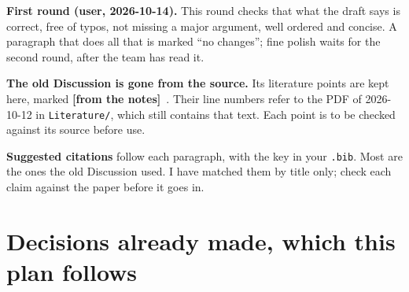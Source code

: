 \documentclass[11pt]{article}
\newcommand{\Note}{\textcolor{open}{\textbf{[from the notes]}}\ }
\begin{document}
\textbf{First round (user, 2026-10-14).} This round checks that what the
draft says is correct, free of typos, not missing a major argument, well
ordered and concise. A paragraph that does all that is marked ``no changes'';
fine polish waits for the second round, after the team has read it.

\textbf{The old Discussion is gone from the source.} Its literature points
are kept here, marked \Note. Their line numbers refer to the PDF of
2026-10-12 in \texttt{Literature/}, which still contains that text. Each
point is to be checked against its source before use.

\textbf{Suggested citations} follow each paragraph, with the key in your
\texttt{.bib}. Most are the ones the old Discussion used. I have matched them
by title only; check each claim against the paper before it goes in.

\section*{Decisions already made, which this plan follows}
\end{document}
